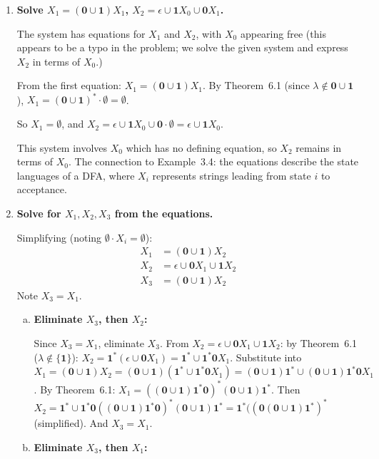 \begin{enumerate}[{6.}1.]
\item \textbf{Solve $X_1=(\pmb{0}\cup\pmb{1})X_1$, $X_2=\epsilon\cup\pmb{1}X_0\cup\pmb{0}X_1$.}

The system has equations for $X_1$ and $X_2$, with $X_0$ appearing free (this appears to be a typo in the problem; we solve the given system and express $X_2$ in terms of $X_0$.)

From the first equation: $X_1=(\pmb{0}\cup\pmb{1})X_1$.  By Theorem~6.1 (since $\lambda\notin\pmb{0}\cup\pmb{1}$), $X_1=(\pmb{0}\cup\pmb{1})^*\cdot\emptyset=\emptyset$.

So $X_1=\emptyset$, and $X_2=\epsilon\cup\pmb{1}X_0\cup\pmb{0}\cdot\emptyset=\epsilon\cup\pmb{1}X_0$.

This system involves $X_0$ which has no defining equation, so $X_2$ remains in terms of $X_0$.  The connection to Example~3.4: the equations describe the state languages of a DFA, where $X_i$ represents strings leading from state $i$ to acceptance.

\item \textbf{Solve for $X_1,X_2,X_3$ from the equations.}

Simplifying (noting $\emptyset\cdot X_i=\emptyset$):
\begin{align*}
  X_1 &= (\pmb{0}\cup\pmb{1})X_2 \\
  X_2 &= \epsilon\cup\pmb{0}X_1\cup\pmb{1}X_2 \\
  X_3 &= (\pmb{0}\cup\pmb{1})X_2
\end{align*}
Note $X_3=X_1$.

\begin{enumerate}[(a)]
  \item \textbf{Eliminate $X_3$, then $X_2$:}

  Since $X_3=X_1$, eliminate $X_3$.  From $X_2=\epsilon\cup\pmb{0}X_1\cup\pmb{1}X_2$: by Theorem~6.1 ($\lambda\notin\{\pmb{1}\}$): $X_2=\pmb{1}^*(\epsilon\cup\pmb{0}X_1)=\pmb{1}^*\cup\pmb{1}^*\pmb{0}X_1$.
  Substitute into $X_1=(\pmb{0}\cup\pmb{1})X_2=(\pmb{0}\cup\pmb{1})(\pmb{1}^*\cup\pmb{1}^*\pmb{0}X_1)=(\pmb{0}\cup\pmb{1})\pmb{1}^*\cup(\pmb{0}\cup\pmb{1})\pmb{1}^*\pmb{0}X_1$.
  By Theorem~6.1: $X_1=((\pmb{0}\cup\pmb{1})\pmb{1}^*\pmb{0})^*(\pmb{0}\cup\pmb{1})\pmb{1}^*$.
  Then $X_2=\pmb{1}^*\cup\pmb{1}^*\pmb{0}((\pmb{0}\cup\pmb{1})\pmb{1}^*\pmb{0})^*(\pmb{0}\cup\pmb{1})\pmb{1}^*=\pmb{1}^*((\pmb{0}(\pmb{0}\cup\pmb{1})\pmb{1}^*)^*$ (simplified).
  And $X_3=X_1$.

  \item \textbf{Eliminate $X_3$, then $X_1$:}


\end{enumerate}
\end{enumerate}
